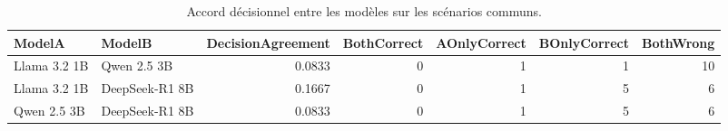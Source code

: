 \begin{table}[!htbp]
\caption{Accord décisionnel entre les modèles sur les scénarios communs.}
\label{tab:ngsim_common_pairwise}
\begin{tabular}{llrrrrr}
\toprule
ModelA & ModelB & DecisionAgreement & BothCorrect & AOnlyCorrect & BOnlyCorrect & BothWrong \\
\midrule
Llama 3.2 1B & Qwen 2.5 3B & 0.0833 & 0 & 1 & 1 & 10 \\
Llama 3.2 1B & DeepSeek-R1 8B & 0.1667 & 0 & 1 & 5 & 6 \\
Qwen 2.5 3B & DeepSeek-R1 8B & 0.0833 & 0 & 1 & 5 & 6 \\
\bottomrule
\end{tabular}
\end{table}
